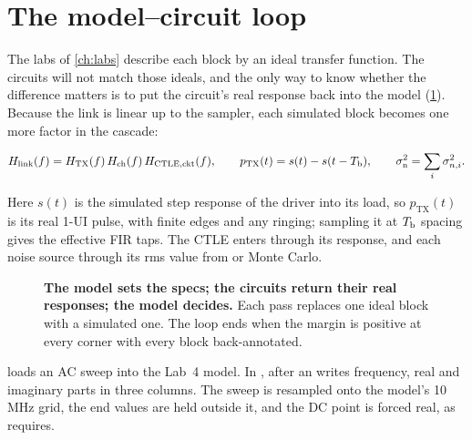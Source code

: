 \section{The model--circuit loop}\label{sec:model-loop}

The labs of \cref{ch:labs} describe each block by an ideal transfer function. The circuits will not match those ideals, and the only way to know whether the difference matters is to put the circuit's real response back into the model (\cref{fig:ch15-loop}). Because the link is linear up to the sampler, each simulated block becomes one more factor in the cascade:

\begin{keyeq}
\begin{equation}
  H_\mathrm{link}(f) = H_\mathrm{TX}(f)\,H_\mathrm{ch}(f)\,H_\mathrm{CTLE,ckt}(f),\qquad
  p_\mathrm{TX}(t) = s(t) - s(t-T_\mathrm{b}),\qquad
  \sigma_\mathrm{n}^2 = \sum_i \sigma_{n,i}^2 .
  \label{eq:ch15-annot}
\end{equation}
\end{keyeq}

Here $s(t)$ is the simulated step response of the driver into its load, so $p_\mathrm{TX}(t)$ is its real 1-UI pulse, with finite edges and any ringing; sampling it at $T_\mathrm{b}$ spacing gives the effective FIR taps. The CTLE enters through its  response, and each noise source through its rms value from  or Monte Carlo.

\begin{figure}[!tbp]
\centering

\caption{\textbf{The model sets the specs; the circuits return their real responses; the model decides.} Each pass replaces one ideal block with a simulated one. The loop ends when the margin is positive at every corner with every block back-annotated.}
\label{fig:ch15-loop}
\end{figure}

 loads an  AC sweep into the Lab~4 model. In ,  after an  writes frequency, real and imaginary parts in three columns. The sweep is resampled onto the model's 10\,MHz grid, the end values are held outside it, and the DC point is forced real, as  requires.


